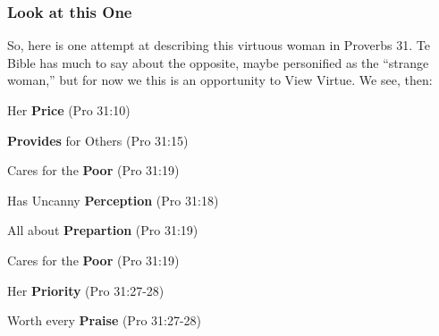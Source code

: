 \subsubsection{Look at this One}
So, here is one attempt at describing this virtuous woman in Proverbs 31. Te Bible has much to say about the opposite, maybe personified as the ``strange woman,'' but for now we this is an opportunity to View Virtue. We see, then:
 \begin{compactenum}[I.][8]

	\item Her \textbf{Price}  (Pro 31:10)
	\item \textbf{Provides} for Others (Pro 31:15)
	\item Cares for the \textbf{Poor} (Pro 31:19)
	\item Has Uncanny \textbf{Perception} (Pro 31:18)
	\item All about \textbf{Prepartion} (Pro 31:19)
	\item Cares for the \textbf{Poor} (Pro 31:19)
	\item Her \textbf{Priority}  (Pro 31:27-28)
	\item Worth every  \textbf{Praise}  (Pro 31:27-28)
\end{compactenum}


